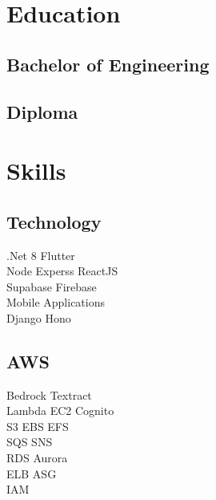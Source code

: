 \documentclass[]{deedy-resume-reversed}
\begin{document}
\begin{minipage}[t]{0.33\textwidth}


\section{Education}

\subsection{Bachelor of Engineering}
\sectionsep

\subsection{Diploma}
\sectionsep


\section{Skills}

\subsection{Technology}
.Net 8 \textbullet Flutter \\
Node  \textbullet Experss \textbullet ReactJS \textbullet \\ 
Supabase \textbullet Firebase  \\
Mobile Applications \\
Django \textbullet Hono \textbullet
\sectionsep

\subsection{AWS}
Bedrock \textbullet Textract \\
Lambda \textbullet EC2 \textbullet Cognito \\
S3 \textbullet EBS \textbullet EFS\\
SQS \textbullet SNS \\
RDS \textbullet Aurora \\
ELB \textbullet ASG \\
IAM \\
\sectionsep


\end{minipage}
\end{document}
